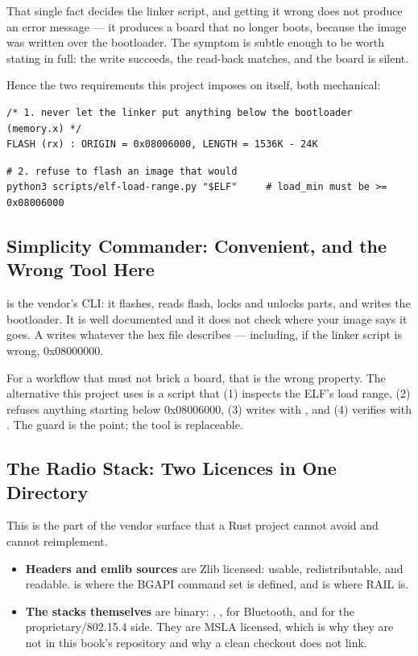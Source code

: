 That single fact decides the linker script, and getting it wrong does not produce an error message —
it produces a board that no longer boots, because the image was written over the bootloader. The
symptom is subtle enough to be worth stating in full: the write succeeds, the read-back matches, and
the board is silent.

Hence the two requirements this project imposes on itself, both mechanical:

\begin{verbatim}
/* 1. never let the linker put anything below the bootloader (memory.x) */
FLASH (rx) : ORIGIN = 0x08006000, LENGTH = 1536K - 24K
\end{verbatim}

\begin{verbatim}
# 2. refuse to flash an image that would
python3 scripts/elf-load-range.py "$ELF"     # load_min must be >= 0x08006000
\end{verbatim}

\subsection{Simplicity Commander: Convenient, and the Wrong Tool Here}

 is the vendor's CLI: it flashes, reads flash, locks and unlocks parts, and
writes the bootloader. It is well documented and it does not check where your image says it goes. A
 writes whatever the hex file describes — including, if the
linker script is wrong, 0x08000000.

For a workflow that must not brick a board, that is the wrong property. The alternative this project
uses is a script that (1) inspects the ELF's load range, (2) refuses anything starting below
0x08006000, (3) writes with , and (4) verifies with
. The guard is the point; the tool is replaceable.

\subsection{The Radio Stack: Two Licences in One Directory}

This is the part of the vendor surface that a Rust project cannot avoid and cannot reimplement.

\begin{itemize}
    \item \textbf{Headers and emlib sources} are Zlib licensed: usable, redistributable, and
          readable.  is where the BGAPI command set is defined, and
           is where RAIL is.
    \item \textbf{The stacks themselves} are binary: ,
          ,  for Bluetooth, and
           for the proprietary/802.15.4 side. They are MSLA licensed, which is
          why they are not in this book's repository and why a clean checkout does not link.
\end{itemize}

